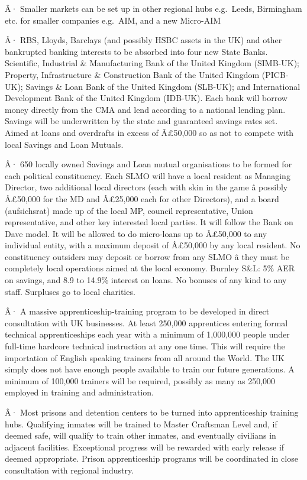 \documentclass[]{tufte-handout}
\begin{document}
Â· Smaller markets can be set up in other regional hubs e.g.~Leeds,
Birmingham etc. for smaller companies e.g.~AIM, and a new Micro-AIM

Â· RBS, Lloyds, Barclays (and possibly HSBC assets in the UK) and other
bankrupted banking interests to be absorbed into four new State Banks.
Scientific, Industrial \& Manufacturing Bank of the United Kingdom
(SIMB-UK); Property, Infrastructure \& Construction Bank of the United
Kingdom (PICB-UK); Savings \& Loan Bank of the United Kingdom (SLB-UK);
and International Development Bank of the United Kingdom (IDB-UK). Each
bank will borrow money directly from the CMA and lend according to a
national lending plan. Savings will be underwritten by the state and
guaranteed savings rates set. Aimed at loans and overdrafts in excess of
Â£50,000 so as not to compete with local Savings and Loan Mutuals.

Â· 650 locally owned Savings and Loan mutual organisations to be formed
for each political constituency. Each SLMO will have a local resident as
Managing Director, two additional local directors (each with skin in the
game â possibly Â£50,000 for the MD and Â£25,000 each for other
Directors), and a board (aufsichsrat) made up of the local MP, council
representative, Union representative, and other key interested local
parties. It will follow the Bank on Dave model. It will be allowed to do
micro-loans up to Â£50,000 to any individual entity, with a maximum
deposit of Â£50,000 by any local resident. No constituency outsiders may
deposit or borrow from any SLMO â they must be completely local
operations aimed at the local economy. Burnley S\&L: 5\% AER on savings,
and 8.9 to 14.9\% interest on loans. No bonuses of any kind to any
staff. Surpluses go to local charities.

Â· A massive apprenticeship-training program to be developed in direct
consultation with UK businesses. At least 250,000 apprentices entering
formal technical apprenticeships each year with a minimum of 1,000,000
people under full-time hardcore technical instruction at any one time.
This will require the importation of English speaking trainers from all
around the World. The UK simply does not have enough people available to
train our future generations. A minimum of 100,000 trainers will be
required, possibly as many as 250,000 employed in training and
administration.

Â· Most prisons and detention centers to be turned into apprenticeship
training hubs. Qualifying inmates will be trained to Master Craftsman
Level and, if deemed safe, will qualify to train other inmates, and
eventually civilians in adjacent facilities. Exceptional progress will
be rewarded with early release if deemed appropriate. Prison
apprenticeship programs will be coordinated in close consultation with
regional industry.
\end{document}
